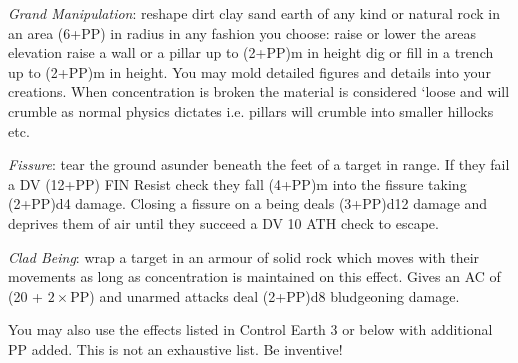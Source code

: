 \begin{multicols}{3}
{\begin{spellitemize}
\item {\it Grand Manipulation}: reshape dirt\comma{} clay\comma{} sand\comma{} earth of any kind\comma{} or natural rock in an area (6+PP) in radius in any fashion you choose: raise or lower the area\apos{}s elevation\comma{} raise a wall or a pillar up to (2+PP)m in height\comma{} dig or fill in a trench up to (2+PP)m in height. You may mold detailed figures and details into your creations. When concentration is broken\comma{} the material is considered `loose\apos{}\comma{} and will crumble as normal physics dictates\comma{} i.e. pillars will crumble into smaller hillocks etc. 
\item {\it Fissure}: tear the ground asunder beneath the feet of a target in range. If they fail a DV (12+PP) FIN Resist check\comma{} they fall (4+PP)m into the fissure\comma{} taking (2+PP)d4 damage. Closing a fissure on a being deals (3+PP)d12 damage and deprives them of air until they succeed a DV 10 ATH check to escape.
\item {\it Clad Being}: wrap a target in an armour of solid rock\comma{} which moves with their movements as long as concentration is maintained on this effect. Gives an AC of (20 + $2\times$PP)\comma{} and unarmed attacks deal (2+PP)d8 bludgeoning damage. 
\end{spellitemize}
You may also use the effects listed in Control Earth 3 or below with \PPDifference{\DVExp}{\DVAdp} additional PP added. 
This is not an exhaustive list. Be inventive!}
\end{multicols}
